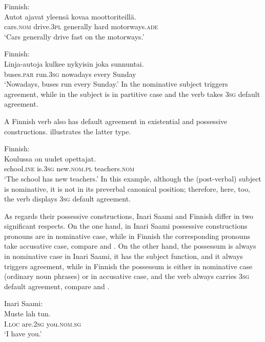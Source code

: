 \documentclass[output=paper,hidelinks]{langscibook}
\begin{document}
\ea%
    \label{ex:FinnoUgric:48}Finnish:\\
    \gll Autot ajavat yleensä kovaa moottoriteillä.\\
        cars.\textsc{nom} drive.\textsc{3pl} generally hard motorways.\textsc{ade}\\
    \glt `Cars generally drive fast on the motorways.'
    \z

\ea%
    \label{ex:FinnoUgric:49}Finnish:\\
    \gll Linja-autoja kulkee nykyisin joka sunnuntai.\\
       buses.\textsc{par} run.\textsc{3sg} nowadays every Sunday \\
    \glt`Nowadays, buses run every Sunday.'
    \z
In  the nominative subject triggers agreement, while in  the subject is in partitive case and the verb takes 3\textsc{sg} default agreement.

A Finnish verb also has default agreement in existential and possessive constructions.  illustrates the latter type.

\ea%
    \label{ex:FinnoUgric:50}Finnish:\\
    \gll Koulussa on uudet opettajat.\\
        school.\textsc{ine} is.\textsc{3sg} new.\textsc{nom.pl} teachers.\textsc{nom}\\
    \glt `The school has new teachers.'
    \z
In this example, although the (post-verbal) subject is nominative, it is not in its preverbal canonical position; therefore, here, too, the verb displays 3\textsc{sg} default agreement.

As regards their possessive constructions, Inari Saami and Finnish differ in two significant respects. On the one hand, in Inari Saami possessive constructions pronouns are in nominative case, while in Finnish the corresponding pronouns take accusative case, compare  and . On the other hand, the possessum is always in nominative case in Inari Saami, it has the subject function, and it always triggers agreement, while in Finnish the possessum is either in nominative case (ordinary noun phrases) or in accusative case, and the verb always carries 3\textsc{sg} default agreement, compare  and .

\ea%
\label{ex:FinnoUgric:51}Inari Saami:\\
    \gll Muste lah tun.\\
        I.\textsc{loc} are.\textsc{2sg} you.\textsc{nom.sg}\\
    \glt`I have you.'
    \z
\end{document}
